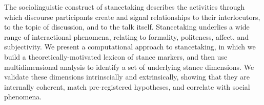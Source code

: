 The sociolinguistic construct of stancetaking describes the activities through which discourse participants create and signal relationships to their interlocutors, to the topic of discussion, and to the talk itself. Stancetaking underlies a wide range of interactional phenomena, relating to formality, politeness, affect, and subjectivity. We present a computational approach to stancetaking, in which we build a theoretically-motivated lexicon of stance markers, and then use multidimensional analysis to identify a set of underlying stance dimensions. We validate these dimensions intrinscially and extrinsically, showing that they are internally coherent, match pre-registered hypotheses, and correlate with social phenomena.
